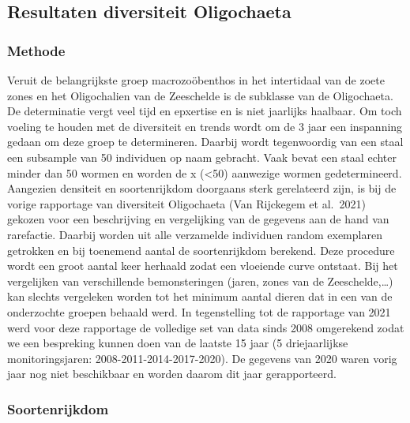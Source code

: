 \documentclass[twoside]{extreport}
\begin{document}
\hypertarget{resultaten-diversiteit-oligochaeta}{%
\subsection{Resultaten diversiteit
Oligochaeta}\label{resultaten-diversiteit-oligochaeta}}

\hypertarget{methode}{%
\subsubsection{Methode}\label{methode}}

Veruit de belangrijkste groep macrozoöbenthos in het intertidaal van de
zoete zones en het Oligochalien van de Zeeschelde is de subklasse van de
Oligochaeta. De determinatie vergt veel tijd en epxertise en is niet
jaarlijks haalbaar. Om toch voeling te houden met de diversiteit en
trends wordt om de 3 jaar een inspanning gedaan om deze groep te
determineren. Daarbij wordt tegenwoordig van een staal een subsample van
50 individuen op naam gebracht. Vaak bevat een staal echter minder dan
50 wormen en worden de x (\textless50) aanwezige wormen gedetermineerd.
Aangezien densiteit en soortenrijkdom doorgaans sterk gerelateerd zijn,
is bij de vorige rapportage van diversiteit Oligochaeta (Van Rijckegem
et al.~2021) gekozen voor een beschrijving en vergelijking van de
gegevens aan de hand van rarefactie. Daarbij worden uit alle verzamelde
individuen random exemplaren getrokken en bij toenemend aantal de
soortenrijkdom berekend. Deze procedure wordt een groot aantal keer
herhaald zodat een vloeiende curve ontstaat. Bij het vergelijken van
verschillende bemonsteringen (jaren, zones van de Zeeschelde,\ldots) kan
slechts vergeleken worden tot het minimum aantal dieren dat in een van
de onderzochte groepen behaald werd. In tegenstelling tot de rapportage
van 2021 werd voor deze rapportage de volledige set van data sinds 2008
omgerekend zodat we een bespreking kunnen doen van de laatste 15 jaar (5
driejaarlijkse monitoringsjaren: 2008-2011-2014-2017-2020). De gegevens
van 2020 waren vorig jaar nog niet beschikbaar en worden daarom dit jaar
gerapporteerd.

\hypertarget{soortenrijkdom-1}{%
\subsubsection{Soortenrijkdom}\label{soortenrijkdom-1}}
\end{document}
